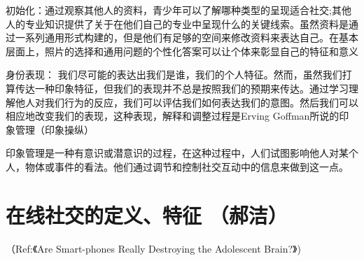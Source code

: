 初始化：通过观察其他人的资料，青少年可以了解哪种类型的呈现适合社交;其他人的专业知识提供了关于在他们自己的专业中呈现什么的关键线索。虽然资料是通过一系列通用形式构建的，但是他们有足够的空间来修改资料来表达自己。在基本层面上，照片的选择和通用问题的个性化答案可以让个体来彰显自己的特征和意义

身份表现：
我们尽可能的表达出我们是谁，我们的个人特征。然而，虽然我们打算传达一种印象特征，但我们的表现并不总是按照我们的预期来传达。通过学习理解他人对我们行为的反应，我们可以评估我们如何表达我们的意图。然后我们可以相应地改变我们的表现，这种表现，解释和调整过程是Erving Goffman所说的印象管理（印象操纵）

印象管理是一种有意识或潜意识的过程，在这种过程中，人们试图影响他人对某个人，物体或事件的看法。他们通过调节和控制社交互动中的信息来做到这一点。







\section{在线社交的定义、特征 %
（郝洁）%
}


（Ref:《Are Smart-phones Really Destroying the Adolescent Brain?》)

